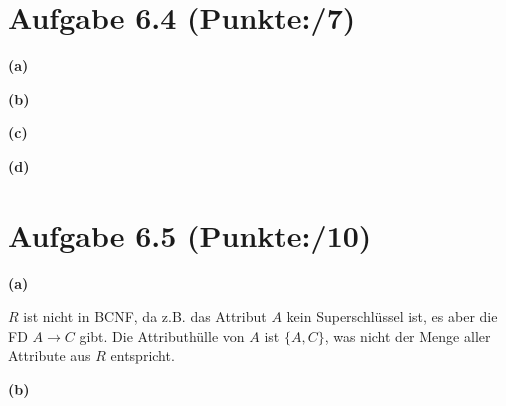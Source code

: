 \documentclass[11pt, a4paper]{article}
\newcommand{\blattnummer}{6}
\newcommand{\pppp}{7}
\newcommand{\ppppp}{10}
\newcommand{\rA}{\rightarrow}
\newcommand{\aufgabe}[2] {\section*{Aufgabe \blattnummer.#1 (Punkte:\qquad/#2)}}
\newcommand{\aufgabenteil}[1] {\textbf{(#1)}}
\begin{document}
\aufgabe{4}{\pppp}
\aufgabenteil{a}
\begin{adjustwidth}{20pt}{20pt}

\end{adjustwidth}
\aufgabenteil{b}
\begin{adjustwidth}{20pt}{20pt}

\end{adjustwidth}
\aufgabenteil{c}
\begin{adjustwidth}{20pt}{20pt}

\end{adjustwidth}
\aufgabenteil{d}
\begin{adjustwidth}{20pt}{20pt}

\end{adjustwidth}



\aufgabe{5}{\ppppp}
\aufgabenteil{a}
\begin{adjustwidth}{20pt}{20pt}
$R$ ist nicht in BCNF, da z.B. das Attribut $A$ kein Superschlüssel ist, es aber die FD $A \rA C$ gibt. Die Attributhülle von $A$ ist $\{A, C\}$, was nicht der Menge aller Attribute aus $R$ entspricht.
\end{adjustwidth}
\aufgabenteil{b}
\end{document}
